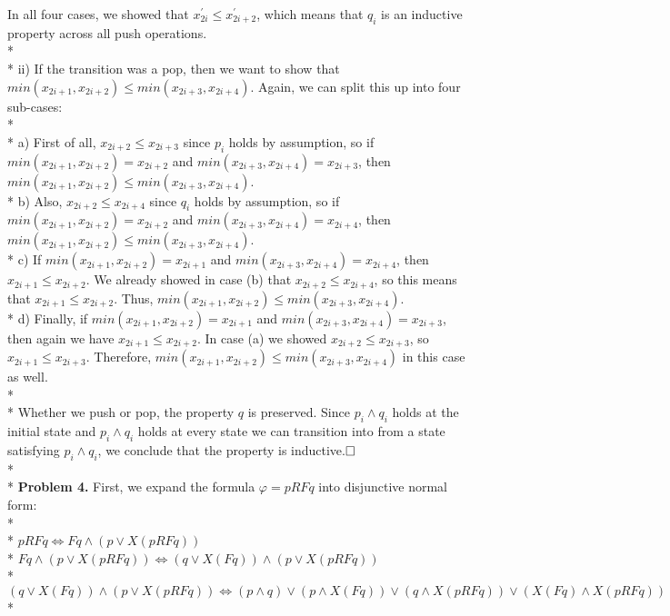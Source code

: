 \documentclass[12pt]{article}
\begin{document}
In all four cases, we showed that $x^\prime_{2i}\leq x^\prime_{2i+2}$, which means that $q_i$ is an inductive property across all push operations.\\*\\*
ii) If the transition was a pop, then we want to show that $min(x_{2i+1},x_{2i+2})\leq min(x_{2i+3},x_{2i+4})$. Again, we can split this up into four sub-cases:\\*\\*
a) First of all, $x_{2i+2}\leq x_{2i+3}$ since $p_i$ holds by assumption, so if $min(x_{2i+1},x_{2i+2})=x_{2i+2}$ and $min(x_{2i+3},x_{2i+4})=x_{2i+3}$, then $min(x_{2i+1},x_{2i+2})\leq min(x_{2i+3},x_{2i+4})$.\\*
b) Also, $x_{2i+2}\leq x_{2i+4}$ since $q_i$ holds by assumption, so if $min(x_{2i+1},x_{2i+2})=x_{2i+2}$ and $min(x_{2i+3},x_{2i+4})=x_{2i+4}$, then $min(x_{2i+1},x_{2i+2})\leq min(x_{2i+3},x_{2i+4})$.\\*
c) If $min(x_{2i+1},x_{2i+2})=x_{2i+1}$ and $min(x_{2i+3},x_{2i+4})=x_{2i+4}$, then $x_{2i+1}\leq x_{2i+2}$. We already showed in case (b) that $x_{2i+2}\leq x_{2i+4}$, so this means that $x_{2i+1}\leq x_{2i+2}$. Thus, $min(x_{2i+1},x_{2i+2})\leq min(x_{2i+3},x_{2i+4})$.\\*
d) Finally, if $min(x_{2i+1},x_{2i+2})=x_{2i+1}$ and $min(x_{2i+3},x_{2i+4})=x_{2i+3}$, then again we have $x_{2i+1}\leq x_{2i+2}$. In case (a) we showed $x_{2i+2}\leq x_{2i+3}$, so $x_{2i+1}\leq x_{2i+3}$. Therefore, $min(x_{2i+1},x_{2i+2})\leq min(x_{2i+3},x_{2i+4})$ in this case as well.\\*\\*
Whether we push or pop, the property $q$ is preserved. Since $p_i\wedge q_i$ holds at the initial state and $p_i\wedge q_i$ holds at every state we can transition into from a state satisfying $p_i\wedge q_i$, we conclude that the property is inductive.$\hfill\Box$\vspace{120px}\\*\\*
\textbf{Problem 4.} First, we expand the formula $\varphi=pRFq$ into disjunctive normal form:\\*\\*
$pRFq\Longleftrightarrow Fq\wedge(p\vee X(pRFq))$\\*
$Fq\wedge(p\vee X(pRFq))\Longleftrightarrow(q\vee X(Fq))\wedge(p\vee X(pRFq))$\\*
$(q\vee X(Fq))\wedge(p\vee X(pRFq))\Longleftrightarrow(p\wedge q)\vee(p\wedge X(Fq))\vee(q\wedge X(pRFq))\vee(X(Fq)\wedge X(pRFq))$\\*
\end{document}

